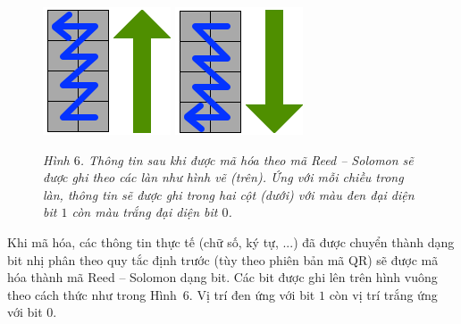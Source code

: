 \begin{multicols}{2}
\begin{figure}[H]
		\includegraphics[height=0.33\linewidth]{12}
		\includegraphics[height=0.33\linewidth]{13}
		\caption{\small\textit{\color{toanhocdoisong}Hình $6$. Thông tin sau khi được mã hóa theo mã Reed -- Solomon sẽ được ghi theo các làn như hình vẽ (trên). Ứng với mỗi chiều trong làn, thông tin sẽ được ghi trong hai cột (dưới) với màu đen đại diện bit $1$ còn màu trắng đại diện bit $0$.}}
		\vspace*{-10pt}
	\end{figure}
	Khi mã hóa, các thông tin thực tế (chữ số, ký tự, ...) đã được chuyển thành dạng bit nhị phân theo quy tắc định trước (tùy theo phiên bản mã QR) sẽ được mã hóa thành mã Reed -- Solomon dạng bit. Các bit được ghi lên trên hình vuông theo cách thức như trong Hình~$6$. Vị trí đen ứng với bit $1$ còn vị trí trắng ứng với bit $0$.
	

\end{multicols}

